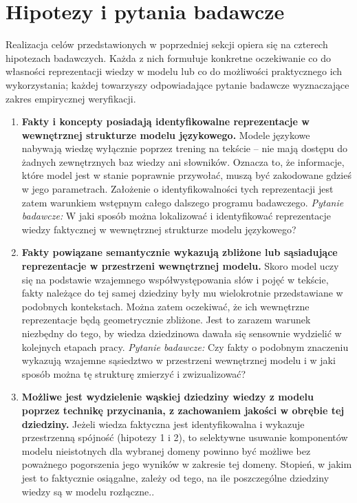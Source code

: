 \section{Hipotezy i pytania badawcze}
\label{sec:hipotezy_pytania}
Realizacja celów przedstawionych w poprzedniej sekcji opiera się na czterech hipotezach badawczych. Każda z nich formułuje konkretne oczekiwanie co do własności reprezentacji wiedzy w modelu lub co do możliwości praktycznego ich wykorzystania; każdej towarzyszy odpowiadające pytanie badawcze wyznaczające zakres empirycznej weryfikacji.
\begin{enumerate}
    \item \textbf{Fakty i koncepty posiadają identyfikowalne reprezentacje w wewnętrznej strukturze modelu językowego.}
    Modele językowe nabywają wiedzę wyłącznie poprzez trening na tekście -- nie mają dostępu do żadnych zewnętrznych baz wiedzy ani słowników. Oznacza to, że informacje, które model jest w stanie poprawnie przywołać, muszą być zakodowane gdzieś w jego parametrach. Założenie o identyfikowalności tych reprezentacji jest zatem warunkiem wstępnym całego dalszego programu badawczego.
    \textit{Pytanie badawcze:} W jaki sposób można lokalizować i identyfikować reprezentacje wiedzy faktycznej w wewnętrznej strukturze modelu językowego?
    \newpage
    \item \textbf{Fakty powiązane semantycznie wykazują zbliżone lub sąsiadujące reprezentacje w przestrzeni wewnętrznej modelu.}
    Skoro model uczy się na podstawie wzajemnego współwystępowania słów i pojęć w tekście, fakty należące do tej samej dziedziny były mu wielokrotnie przedstawiane w podobnych kontekstach. Można zatem oczekiwać, że ich wewnętrzne reprezentacje będą geometrycznie zbliżone. Jest to zarazem warunek niezbędny do tego, by wiedza dziedzinowa dawała się sensownie wydzielić w kolejnych etapach pracy.
    \textit{Pytanie badawcze:} Czy fakty o podobnym znaczeniu wykazują wzajemne sąsiedztwo w przestrzeni wewnętrznej modelu i w jaki sposób można tę strukturę zmierzyć i zwizualizować?
    \item \textbf{Możliwe jest wydzielenie wąskiej dziedziny wiedzy z modelu poprzez technikę przycinania, z zachowaniem jakości w obrębie tej dziedziny.}
    Jeżeli wiedza faktyczna jest identyfikowalna i wykazuje przestrzenną spójność (hipotezy 1 i 2), to selektywne usuwanie komponentów modelu nieistotnych dla wybranej domeny powinno być możliwe bez poważnego pogorszenia jego wyników w zakresie tej domeny. Stopień, w jakim jest to faktycznie osiągalne, zależy od tego, na ile poszczególne dziedziny wiedzy są w modelu rozłączne..

\end{enumerate}
